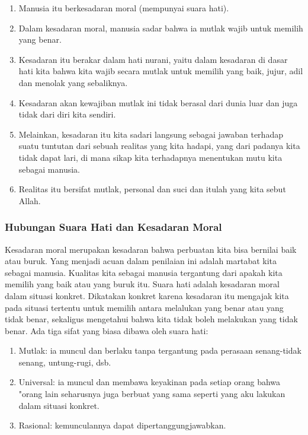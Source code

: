 \documentclass[10pt,a4paper]{article}
\def\tightlist{}
\begin{document}
\begin{multicols}{2}
\begin{enumerate}
\def\labelenumi{\arabic{enumi}.}
\tightlist
\item
  Manusia itu berkesadaran moral (mempunyai suara hati).
\item
  Dalam kesadaran moral, manusia sadar bahwa ia mutlak wajib untuk
  memilih yang benar.
\item
  Kesadaran itu berakar dalam hati nurani, yaitu dalam kesadaran di
  dasar hati kita bahwa kita wajib secara mutlak untuk memilih yang
  baik, jujur, adil dan menolak yang sebaliknya.
\item
  Kesadaran akan kewajiban mutlak ini tidak berasal dari dunia luar dan
  juga tidak dari diri kita sendiri.
\item
  Melainkan, kesadaran itu kita sadari langsung sebagai jawaban terhadap
  suatu tuntutan dari sebuah realitas yang kita hadapi, yang dari
  padanya kita tidak dapat lari, di mana sikap kita terhadapnya
  menentukan mutu kita sebagai manusia.
\item
  Realitas itu bersifat mutlak, personal dan suci dan itulah yang kita
  sebut Allah.
\end{enumerate}

\hypertarget{hubungan-suara-hati-dan-kesadaran-moral}{%
\subsubsection{Hubungan Suara Hati dan Kesadaran
Moral}\label{hubungan-suara-hati-dan-kesadaran-moral}}

Kesadaran moral merupakan kesadaran bahwa perbuatan kita bisa bernilai
baik atau buruk. Yang menjadi acuan dalam penilaian ini adalah martabat
kita sebagai manusia. Kualitas kita sebagai manusia tergantung dari
apakah kita memilih yang baik atau yang buruk itu. Suara hati adalah
kesadaran moral dalam situasi konkret. Dikatakan konkret karena
kesadaran itu mengajak kita pada situasi tertentu untuk memilih antara
melalukan yang benar atau yang tidak benar, sekaligus mengetahui bahwa
kita tidak boleh melakukan yang tidak benar. Ada tiga sifat yang biasa
dibawa oleh suara hati:

\begin{enumerate}
\def\labelenumi{\arabic{enumi}.}
\tightlist
\item
  Mutlak: ia muncul dan berlaku tanpa tergantung pada perasaan
  senang-tidak senang, untung-rugi, dsb.
\item
  Universal: ia muncul dan membawa keyakinan pada setiap orang bahwa
  "orang lain seharusnya juga berbuat yang sama seperti yang aku lakukan
  dalam situasi konkret.
\item
  Rasional: kemunculannya dapat dipertanggungjawabkan.
\end{enumerate}


\end{multicols}
\end{document}
